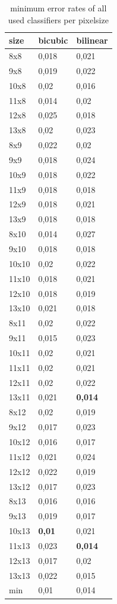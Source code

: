 \documentclass{article}
\begin{document}
\clearpage

\begin{table}[H]
  \centering  
    \begin{tabular}{|l|ll|} \hline
    \textbf{size} & \textbf{bicubic} & \textbf{bilinear} \\ \hline \hline
    8x8   & 0,018 & 0,021 \\
    9x8   & 0,019 & 0,022 \\
    10x8  & 0,02  & 0,016 \\
    11x8  & 0,014 & 0,02 \\
    12x8  & 0,025 & 0,018 \\
    13x8  & 0,02  & 0,023 \\
    8x9   & 0,022 & 0,02 \\
    9x9   & 0,018 & 0,024 \\
    10x9  & 0,018 & 0,022 \\
    11x9  & 0,018 & 0,018 \\
    12x9  & 0,018 & 0,021 \\
    13x9  & 0,018 & 0,018 \\
    8x10  & 0,014 & 0,027 \\
    9x10  & 0,018 & 0,018 \\
    10x10 & 0,02  & 0,022 \\
    11x10 & 0,018 & 0,021 \\
    12x10 & 0,018 & 0,019 \\
    13x10 & 0,021 & 0,018 \\
    8x11  & 0,02  & 0,022 \\
    9x11  & 0,015 & 0,023 \\
    10x11 & 0,02  & 0,021 \\
    11x11 & 0,02  & 0,021 \\
    12x11 & 0,02  & 0,022 \\
    13x11 & 0,021 & \textbf{0,014} \\
    8x12  & 0,02  & 0,019 \\
    9x12  & 0,017 & 0,023 \\
    10x12 & 0,016 & 0,017 \\
    11x12 & 0,021 & 0,024 \\
    12x12 & 0,022 & 0,019 \\
    13x12 & 0,017 & 0,023 \\
    8x13  & 0,016 & 0,016 \\
    9x13  & 0,019 & 0,017 \\
    10x13 & \textbf{0,01} & 0,021 \\
    11x13 & 0,023 & \textbf{0,014} \\
    12x13 & 0,017 & 0,02 \\
    13x13 & 0,022 & 0,015 \\
    \hline
    min   & 0,01  & 0,014 \\
		\hline
    \end{tabular}%
  \caption{minimum error rates of all used classifiers per pixelsize} \label{table: minimum error rates all sizes}%
\end{table}%
 
\end{document}
